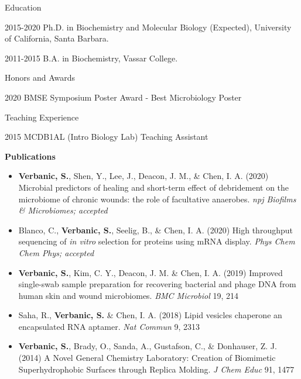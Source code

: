 \begin{vitae}

\begin{vitaesection}{Education}
\vspace{-0.1cm}
\item [2015-2020]	Ph.D. in Biochemistry and Molecular Biology (Expected), University of California, Santa Barbara.
\item [2011-2015]	B.A. in Biochemistry, Vassar College.
\end{vitaesection}

\begin{vitaesection}{Honors and Awards}
\item[2020]	BMSE Symposium Poster Award - Best Microbiology Poster
\end{vitaesection}

\begin{vitaesection}{Teaching Experience}
\item [2015]	MCDB1AL (Intro Biology Lab) Teaching Assistant
\end{vitaesection}

\textbf{Publications}
\begin{itemize}
\item \textbf{Verbanic, S.}, Shen, Y., Lee, J., Deacon, J. M., \& Chen, I. A. (2020) Microbial predictors of healing and short-term effect of debridement on the microbiome of chronic wounds: the role of facultative anaerobes. \textit{npj Biofilms \& Microbiomes; accepted} 

\item Blanco, C., \textbf{Verbanic, S.}, Seelig, B., \& Chen, I. A. (2020) High throughput sequencing of \textit{in vitro} selection for proteins using mRNA display. \textit{Phys Chem Chem Phys; accepted}

\item \textbf{Verbanic, S.}, Kim, C. Y., Deacon, J. M. \& Chen, I. A. (2019) Improved single-swab sample preparation for recovering bacterial and phage DNA from human skin and wound microbiomes. \textit{BMC Microbiol} 19, 214

\item Saha, R., \textbf{Verbanic, S.} \& Chen, I. A. (2018) Lipid vesicles chaperone an encapsulated RNA aptamer. \textit{Nat Commun} 9, 2313

\item \textbf{Verbanic, S.}, Brady, O., Sanda, A., Gustafson, C., \& Donhauser, Z. J. (2014) A Novel General Chemistry Laboratory: Creation of Biomimetic Superhydrophobic Surfaces through Replica Molding. \textit{J Chem Educ} 91, 1477
\end{itemize}


\end{vitae}
